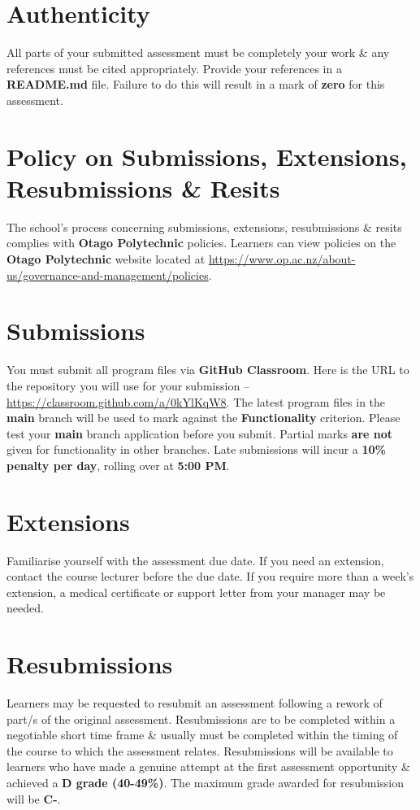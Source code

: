 \documentclass{article}
\begin{document}
\section*{Authenticity}
All parts of your submitted assessment must be completely your work \& any references must be cited appropriately. Provide your references in a \textbf{README.md} file. Failure to do this will result in a mark of \textbf{zero} for this assessment.

\section*{Policy on Submissions, Extensions, Resubmissions \& Resits}
The school's process concerning submissions, extensions, resubmissions \& resits complies with \textbf{Otago Polytechnic} policies. Learners can view policies on the \textbf{Otago Polytechnic} website located at \href{https://www.op.ac.nz/about-us/governance-and-management/policies}{https://www.op.ac.nz/about-us/governance-and-management/policies}.

\section*{Submissions}
You must submit all program files via \textbf{GitHub Classroom}. Here is the URL to the repository you will use for your submission – \href{https://classroom.github.com/a/0kYlKqW8}{https://classroom.github.com/a/0kYlKqW8}. The latest program files in the \textbf{main} branch will be used to mark against the \textbf{Functionality} criterion. Please test your \textbf{main} branch application before you submit. Partial marks \textbf{are not} given for functionality in other branches. Late submissions will incur a \textbf{10\% penalty per day}, rolling over at \textbf{5:00 PM}.

\section*{Extensions}
Familiarise yourself with the assessment due date. If you need an extension, contact the course lecturer before the due date. If you require more than a week's extension, a medical certificate or support letter from your manager may be needed.

\section*{Resubmissions}
Learners may be requested to resubmit an assessment following a rework of part/s of the original assessment. Resubmissions are to be completed within a negotiable short time frame \& usually must be completed within the timing of the course to which the assessment relates. Resubmissions will be available to learners who have made a genuine attempt at the first assessment opportunity \& achieved a \textbf{D grade (40-49\%)}. The maximum grade awarded for resubmission will be \textbf{C-}.
\end{document}
